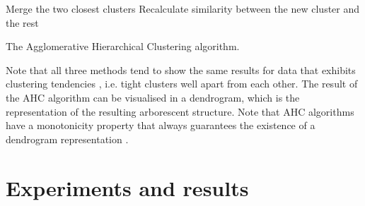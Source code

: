 \documentclass[pdftex,11pt,a4paper]{article}
\theoremstyle{definition}
\theoremstyle{remark}
\begin{document}
\begin{algorithm}
\begin{algorithmic}[1]
\Repeat
\State Merge the two closest clusters
\State Recalculate similarity between the new cluster and the rest
\EndFunction
\caption{The Agglomerative Hierarchical Clustering algorithm.}\label{alg_ahc}
\end{algorithmic}
\end{algorithm}
\par Note that all three methods tend to show the same results for data that exhibits clustering tendencies \cite{hastie2008}, i.e. tight clusters well apart from each other. The result of the AHC algorithm can be visualised in a dendrogram, which is the representation of the resulting arborescent structure. Note that AHC algorithms have a monotonicity property that always guarantees the existence of a dendrogram representation \cite{hastie2008}.

\section{Experiments and results}
\end{document}
